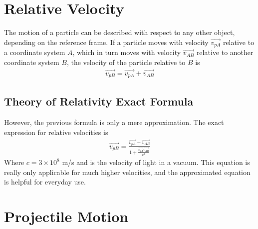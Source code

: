 \documentclass[11pt]{article}
\begin{document}
\section{Relative Velocity}

The motion of a particle can be described with respect to any other object, depending on the reference frame. If a particle moves with velocity $\Vec{v_{pA}}$ relative to a coordinate system $A$, which in turn moves with velocity $\Vec{v_{AB}}$ relative to another coordinate system $B$, the velocity of the particle relative to $B$ is 
\begin{align*}
    \Vec{v_{pB}} = \Vec{v_{pA}} + \Vec{v_{AB}}
\end{align*}

\subsection{Theory of Relativity Exact Formula}

However, the previous formula is only a mere approximation. The exact expression for relative velocities is
\begin{align*}
    \Vec{v_{pB}} = \frac{\Vec{v_{pA}} + \Vec{v_{AB}}}{1 + \frac{\Vec{v_{pA}}\Vec{v_{AB}}}{c^{2}}}
\end{align*}
Where $c = 3\times 10^{8}$ m/s and is the velocity of light in a vacuum. This equation is really only applicable for much higher velocities, and the approximated equation is helpful for everyday use.

\section{Projectile Motion}
\end{document}
